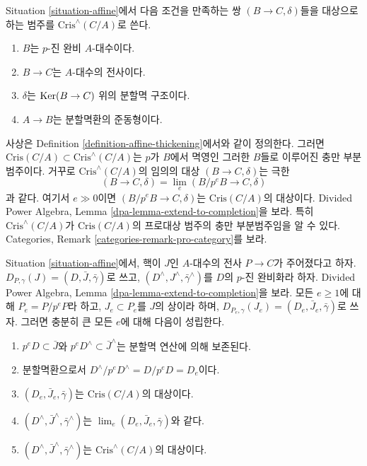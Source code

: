\begin{remark}
\label{remark-completed-affine-site}
Situation \ref{situation-affine}에서 다음 조건을 만족하는 쌍
$(B \to C, \delta)$들을 대상으로 하는 범주를
$\text{Cris}^\wedge(C/A)$로 쓴다.
\begin{enumerate}
\item $B$는 $p$-진 완비 $A$-대수이다.
\item $B \to C$는 $A$-대수의 전사이다.
\item $\delta$는 $\mathop{\mathrm{Ker}}(B \to C)$ 위의 분할멱 구조이다.
\item $A \to B$는 분할멱환의 준동형이다.
\end{enumerate}
사상은 Definition \ref{definition-affine-thickening}에서와 같이 정의한다.
그러면 $\text{Cris}(C/A) \subset \text{Cris}^\wedge(C/A)$는
$p$가 $B$에서 멱영인 그러한 $B$들로 이루어진 충만 부분범주이다.
거꾸로 $\text{Cris}^\wedge(C/A)$의 임의의 대상
$(B \to C, \delta)$는 극한
$$
(B \to C, \delta) = \lim_e (B/p^eB \to C, \delta)
$$
과 같다. 여기서 $e \gg 0$이면 $(B/p^eB \to C, \delta)$는
$\text{Cris}(C/A)$의 대상이다. Divided Power Algebra,
Lemma \ref{dpa-lemma-extend-to-completion}을 보라.
특히 $\text{Cris}^\wedge(C/A)$가 $\text{Cris}(C/A)$의
프로대상 범주의 충만 부분범주임을 알 수 있다. Categories,
Remark \ref{categories-remark-pro-category}를 보라.
\end{remark}

\begin{lemma}
\label{lemma-list-properties}
Situation \ref{situation-affine}에서, 핵이 $J$인 $A$-대수의 전사
$P \to C$가 주어졌다고 하자.
$D_{P, \gamma}(J) = (D, \bar J, \bar\gamma)$로 쓰고,
$(D^\wedge, J^\wedge, \bar\gamma^\wedge)$를 $D$의 $p$-진 완비화라 하자.
Divided Power Algebra, Lemma \ref{dpa-lemma-extend-to-completion}을 보라.
모든 $e \geq 1$에 대해 $P_e = P/p^eP$라 하고,
$J_e \subset P_e$를 $J$의 상이라 하며,
$D_{P_e, \gamma}(J_e) = (D_e, \bar J_e, \bar\gamma)$로 쓰자.
그러면 충분히 큰 모든 $e$에 대해 다음이 성립한다.
\begin{enumerate}
\item $p^eD \subset \bar J$와 $p^eD^\wedge \subset \bar J^\wedge$는
분할멱 연산에 의해 보존된다.
\item 분할멱환으로서 $D^\wedge/p^eD^\wedge = D/p^eD = D_e$이다.
\item $(D_e, \bar J_e, \bar\gamma)$는 $\text{Cris}(C/A)$의 대상이다.
\item $(D^\wedge, \bar J^\wedge, \bar\gamma^\wedge)$는
$\lim_e (D_e, \bar J_e, \bar\gamma)$와 같다.
\item $(D^\wedge, \bar J^\wedge, \bar\gamma^\wedge)$는
$\text{Cris}^\wedge(C/A)$의 대상이다.
\end{enumerate}
\end{lemma}

